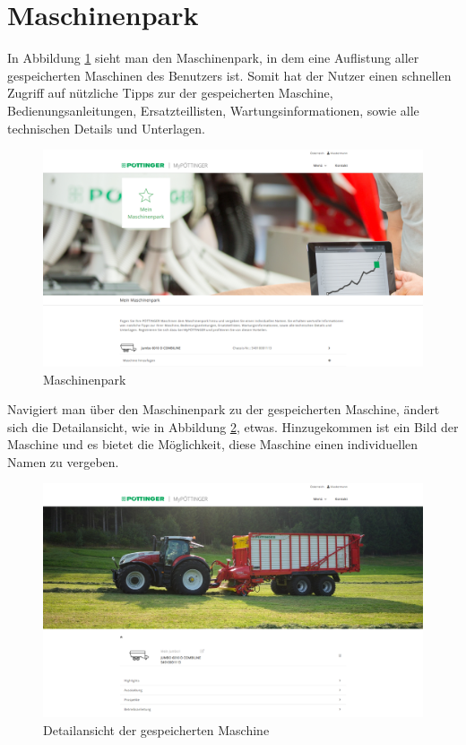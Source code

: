 \section{Maschinenpark}

In Abbildung \ref{fig:maschinenpark} sieht man den Maschinenpark, in dem eine Auflistung aller gespeicherten Maschinen des Benutzers ist. Somit hat der Nutzer einen schnellen Zugriff auf nützliche Tipps zur der gespeicherten Maschine, Bedienungsanleitungen, Ersatzteillisten, Wartungsinformationen, sowie alle technischen Details und Unterlagen.

\begin{figure}[H]
	\centerline{
		\includegraphics[width=1\textwidth, frame]{./grafiken/erm_maschinenpark.png}
	}
	\vskip0pt
	\caption{Maschinenpark} \label{fig:maschinenpark}
\end{figure}

Navigiert man über den Maschinenpark zu der gespeicherten Maschine, ändert sich die Detailansicht, wie in Abbildung \ref{fig:savedMaschine}, etwas. Hinzugekommen ist ein Bild der Maschine und es bietet die Möglichkeit, diese Maschine einen individuellen Namen zu vergeben.

\begin{figure}[H]
	\centerline{
		\includegraphics[width=1\textwidth, frame]{./grafiken/erm_detailansicht_saved_machine.png}
	}
	\vskip0pt
	\caption{Detailansicht der gespeicherten Maschine} \label{fig:savedMaschine}
\end{figure}

